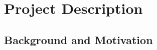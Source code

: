 \documentclass[11pt]{article}
\begin{document}
\appendix

\addtocounter{section}{3}
 
\section{Project Description}

\subsection{Background and Motivation}

\end{document}
